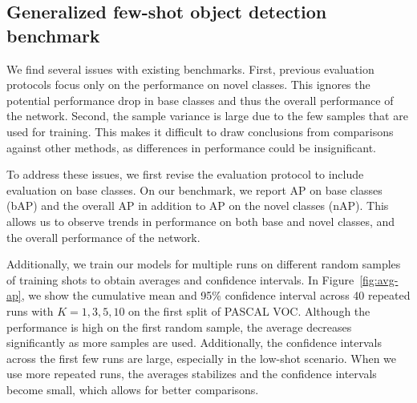 \subsection{Generalized few-shot object detection benchmark}
\label{sec:revised_bench}
We find several issues with existing benchmarks.
First, previous evaluation protocols focus only on the performance on novel classes.
This ignores the potential performance drop in base classes and thus the overall performance of the network.
Second, the sample variance is large due to the few samples that are used for training.
This makes it difficult to draw conclusions from comparisons against other methods, as differences in performance could be insignificant.

To address these issues, we first revise the evaluation protocol to include evaluation on base classes. On our benchmark, we report AP on base classes (bAP) and the overall AP in addition to AP on the novel classes (nAP). This allows us to observe trends in performance on both base and novel classes, and the overall performance of the network.

Additionally, we train our models for multiple runs on different random samples of training shots to obtain averages and confidence intervals.
In Figure~\ref{fig:avg-ap}, we show the cumulative mean and 95\% confidence interval across 40 repeated runs with $K=1,3,5,10$ on the first split of PASCAL VOC.
Although the performance is high on the first random sample, the average decreases significantly as more samples are used.
Additionally, the confidence intervals across the first few runs are large, especially in the low-shot scenario.
When we use more repeated runs, the averages stabilizes and the confidence intervals become small, which allows for better comparisons.

